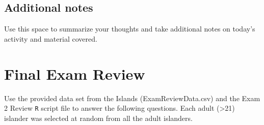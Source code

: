 \documentclass[
]{report}
\begin{document}
\hypertarget{additional-notes-24}{%
\subsection{Additional notes}\label{additional-notes-24}}

Use this space to summarize your thoughts and take additional notes on today's activity and material covered.

\newpage

\hypertarget{final-exam-review}{%
\section{Final Exam Review}\label{final-exam-review}}


Use the provided data set from the Islands (ExamReviewData.csv) and the Exam 2 Review \texttt{R} script file to answer the following questions. Each adult (\textgreater21) islander was selected at random from all the adult islanders.
\end{document}

